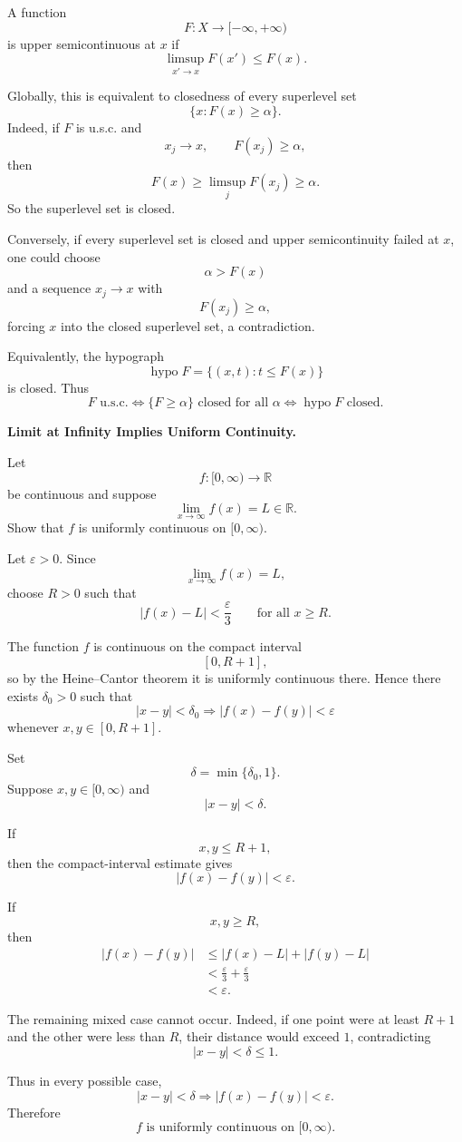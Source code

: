 \begin{solution}
A function
\[
F:X\to[-\infty,+\infty)
\]
is upper semicontinuous at \(x\) if
\[
\boxed{
\limsup_{x'\to x}F(x')
\le
F(x).
}
\]

Globally, this is equivalent to closedness of every superlevel set
\[
\{x:F(x)\ge\alpha\}.
\]
Indeed, if \(F\) is u.s.c. and
\[
x_j\to x,
\qquad
F(x_j)\ge\alpha,
\]
then
\[
F(x)
\ge
\limsup_jF(x_j)
\ge
\alpha.
\]
So the superlevel set is closed.

Conversely, if every superlevel set is closed and upper semicontinuity failed at \(x\), one
could choose
\[
\alpha>F(x)
\]
and a sequence \(x_j\to x\) with
\[
F(x_j)\ge\alpha,
\]
forcing \(x\) into the closed superlevel set, a contradiction.

Equivalently, the hypograph
\[
\operatorname{hypo}F
=
\{(x,t):t\le F(x)\}
\]
is closed. Thus
\[
\boxed{
F\text{ u.s.c.}
\iff
\{F\ge\alpha\}\text{ closed for all }\alpha
\iff
\operatorname{hypo}F\text{ closed}.
}
\]
\end{solution}


\begin{problem}[CP-II-0352]
\label{prob:cp-ii-0352}
\textbf{Limit at Infinity Implies Uniform Continuity.}

\hspace*{1.5em}Let
\[
f:[0,\infty)\to\mathbb R
\]
be continuous and suppose
\[
\lim_{x\to\infty}f(x)=L\in\mathbb R.
\]
Show that \(f\) is uniformly continuous on \([0,\infty)\).
\end{problem}

\begin{solution}
Let \(\varepsilon>0\). Since
\[
\lim_{x\to\infty}f(x)=L,
\]
choose \(R>0\) such that
\[
|f(x)-L|<\frac{\varepsilon}{3}
\qquad
\text{for all }x\ge R.
\]

The function \(f\) is continuous on the compact interval
\[
[0,R+1],
\]
so by the Heine--Cantor theorem it is uniformly continuous there. Hence there
exists \(\delta_0>0\) such that
\[
|x-y|<\delta_0
\Longrightarrow
|f(x)-f(y)|<\varepsilon
\]
whenever \(x,y\in[0,R+1]\).

Set
\[
\delta=\min\{\delta_0,1\}.
\]
Suppose \(x,y\in[0,\infty)\) and
\[
|x-y|<\delta.
\]

If
\[
x,y\le R+1,
\]
then the compact-interval estimate gives
\[
|f(x)-f(y)|<\varepsilon.
\]

If
\[
x,y\ge R,
\]
then
\[
\begin{aligned}
|f(x)-f(y)|
&\le |f(x)-L|+|f(y)-L|\\
&<\frac{\varepsilon}{3}+\frac{\varepsilon}{3}\\
&<\varepsilon.
\end{aligned}
\]

The remaining mixed case cannot occur. Indeed, if one point were at least
\(R+1\) and the other were less than \(R\), their distance would exceed \(1\),
contradicting
\[
|x-y|<\delta\le1.
\]

Thus in every possible case,
\[
|x-y|<\delta
\Longrightarrow
|f(x)-f(y)|<\varepsilon.
\]
Therefore
\[
\boxed{
f\text{ is uniformly continuous on }[0,\infty).
}
\]
\end{solution}


